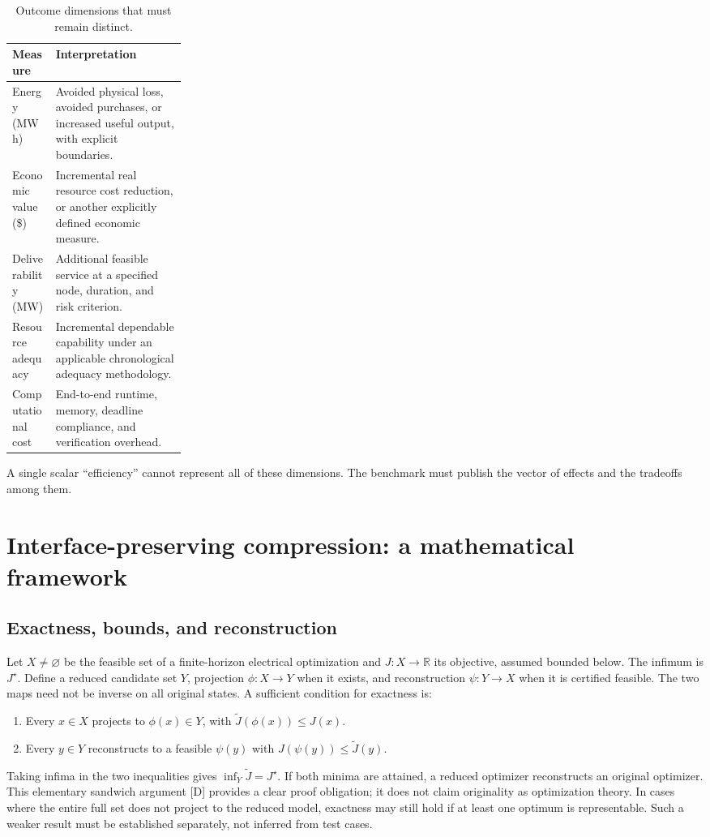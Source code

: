 \documentclass[11pt,letterpaper]{article}
\begin{document}
\begin{table}[htbp]
\centering\small
\caption{Outcome dimensions that must remain distinct.}
\begin{tabularx}{\linewidth}{p{0.25\linewidth}Y}
\toprule
Measure & Interpretation\\
\midrule
Energy (MWh) & Avoided physical loss, avoided purchases, or increased useful output, with explicit boundaries.\\
Economic value (\$) & Incremental real resource cost reduction, or another explicitly defined economic measure.\\
Deliverability (MW) & Additional feasible service at a specified node, duration, and risk criterion.\\
Resource adequacy & Incremental dependable capability under an applicable chronological adequacy methodology.\\
Computational cost & End-to-end runtime, memory, deadline compliance, and verification overhead.\\
\bottomrule
\end{tabularx}
\end{table}
A single scalar ``efficiency'' cannot represent all of these dimensions. The benchmark must publish the vector of effects and the tradeoffs among them.

\section{Interface-preserving compression: a mathematical framework}
\label{sec:compression}
\subsection{Exactness, bounds, and reconstruction}
Let $X\ne\varnothing$ be the feasible set of a finite-horizon electrical optimization and $J:X\to\mathbb R$ its objective, assumed bounded below. The infimum is $J^\star$. Define a reduced candidate set $Y$, projection $\phi:X\to Y$ when it exists, and reconstruction $\psi:Y\to X$ when it is certified feasible. The two maps need not be inverse on all original states. A sufficient condition for exactness is:
\begin{enumerate}
\item Every $x\in X$ projects to $\phi(x)\in Y$, with $\widetilde J(\phi(x))\le J(x)$.
\item Every $y\in Y$ reconstructs to a feasible $\psi(y)$ with $J(\psi(y))\le\widetilde J(y)$.
\end{enumerate}
Taking infima in the two inequalities gives $\inf_Y\widetilde J=J^\star$. If both minima are attained, a reduced optimizer reconstructs an original optimizer. This elementary sandwich argument [D] provides a clear proof obligation; it does not claim originality as optimization theory. In cases where the entire full set does not project to the reduced model, exactness may still hold if at least one optimum is representable. Such a weaker result must be established separately, not inferred from test cases.
\end{document}
